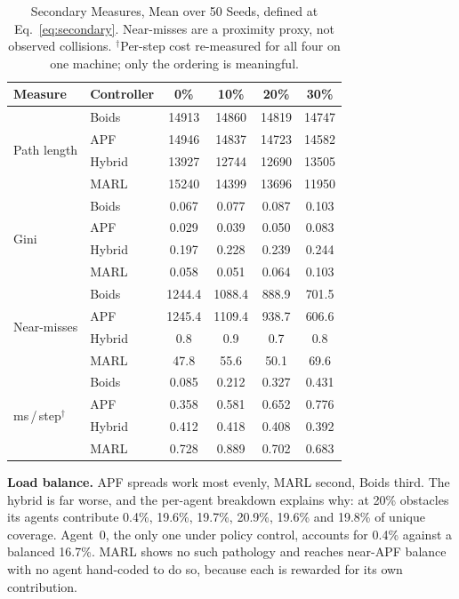 \documentclass[a4paper, 10pt, conference]{ieeeconf}
\begin{document}
\begin{table}[htb]
\centering
\caption{Secondary Measures, Mean over 50 Seeds, defined at
Eq.~\ref{eq:secondary}. Near-misses are a proximity proxy, not
observed collisions. $^\dagger$Per-step cost re-measured for all four
on one machine; only the ordering is meaningful.}
\label{tab:extended}
\scriptsize
\setlength{\tabcolsep}{3pt}
\begin{tabular}{llcccc}
\toprule
\textbf{Measure} & \textbf{Controller} & \textbf{0\%} & \textbf{10\%} &
\textbf{20\%} & \textbf{30\%} \\
\midrule
\multirow{4}{*}{Path length}
 & Boids  & 14913 & 14860 & 14819 & 14747 \\
 & APF    & 14946 & 14837 & 14723 & 14582 \\
 & Hybrid & 13927 & 12744 & 12690 & 13505 \\
 & MARL   & 15240 & 14399 & 13696 & 11950 \\
\midrule
\multirow{4}{*}{Gini}
 & Boids  & 0.067 & 0.077 & 0.087 & 0.103 \\
 & APF    & 0.029 & 0.039 & 0.050 & 0.083 \\
 & Hybrid & 0.197 & 0.228 & 0.239 & 0.244 \\
 & MARL   & 0.058 & 0.051 & 0.064 & 0.103 \\
\midrule
\multirow{4}{*}{Near-misses}
 & Boids  & 1244.4 & 1088.4 & 888.9 & 701.5 \\
 & APF    & 1245.4 & 1109.4 & 938.7 & 606.6 \\
 & Hybrid & 0.8    & 0.9    & 0.7   & 0.8   \\
 & MARL   & 47.8   & 55.6   & 50.1  & 69.6  \\
\midrule
\multirow{4}{*}{ms\,/\,step$^\dagger$}
 & Boids  & 0.085 & 0.212 & 0.327 & 0.431 \\
 & APF    & 0.358 & 0.581 & 0.652 & 0.776 \\
 & Hybrid & 0.412 & 0.418 & 0.408 & 0.392 \\
 & MARL   & 0.728 & 0.889 & 0.702 & 0.683 \\
\bottomrule
\end{tabular}
\end{table}

\textbf{Load balance.} APF spreads work most evenly, MARL second,
Boids third. The hybrid is far worse, and the per-agent breakdown
explains why: at 20\% obstacles its agents contribute 0.4\%, 19.6\%,
19.7\%, 20.9\%, 19.6\% and 19.8\% of unique coverage. Agent~0, the
only one under policy control, accounts for 0.4\% against a balanced
16.7\%. MARL shows no such pathology and reaches near-APF balance with
no agent hand-coded to do so, because each is rewarded for its own
contribution.
\end{document}
